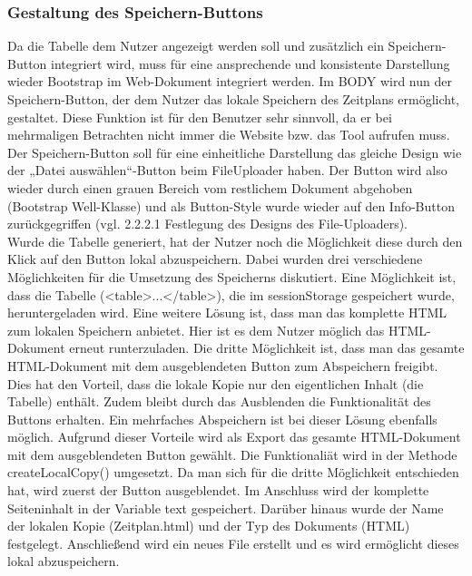{\subsubsection{Gestaltung des Speichern-Buttons}
Da die Tabelle dem Nutzer angezeigt werden soll und zusätzlich ein Speichern-Button integriert wird, muss für eine ansprechende und konsistente Darstellung wieder Bootstrap im Web-Dokument integriert werden. Im BODY wird nun der Speichern-Button, der dem Nutzer das lokale Speichern des Zeitplans ermöglicht, gestaltet. Diese Funktion ist für den Benutzer sehr sinnvoll, da er bei mehrmaligen Betrachten nicht immer die Website bzw. das Tool aufrufen muss. Der Speichern-Button soll für eine einheitliche Darstellung das gleiche Design wie der „Datei auswählen“-Button beim FileUploader haben. Der Button wird also wieder durch einen grauen Bereich vom restlichem Dokument abgehoben (Bootstrap Well-Klasse) und als Button-Style wurde wieder auf den Info-Button zurückgegriffen (vgl. 2.2.2.1 Festlegung des Designs des File-Uploaders).\\
Wurde die Tabelle generiert, hat der Nutzer noch die Möglichkeit diese durch den Klick auf den Button lokal abzuspeichern. Dabei wurden drei verschiedene Möglichkeiten für die Umsetzung des Speicherns diskutiert. Eine Möglichkeit ist, dass die Tabelle (<table>...</table>), die im sessionStorage gespeichert wurde, heruntergeladen wird. Eine weitere Lösung ist, dass man das komplette HTML zum lokalen Speichern anbietet. Hier ist es dem Nutzer möglich das HTML-Dokument erneut runterzuladen. Die dritte Möglichkeit ist, dass man das gesamte HTML-Dokument mit dem ausgeblendeten Button zum Abspeichern freigibt. Dies hat den Vorteil, dass die lokale Kopie nur den eigentlichen Inhalt (die Tabelle) enthält. Zudem bleibt durch das Ausblenden die Funktionalität des Buttons erhalten. Ein mehrfaches Abspeichern ist bei dieser Lösung ebenfalls möglich. Aufgrund dieser Vorteile wird als Export das gesamte HTML-Dokument mit dem ausgeblendeten Button gewählt. 
Die Funktionaliät wird in der Methode createLocalCopy() umgesetzt. Da man sich für die dritte Möglichkeit entschieden hat, wird zuerst der Button ausgeblendet. Im Anschluss wird der komplette Seiteninhalt in der Variable text gespeichert. Darüber hinaus wurde der Name der lokalen Kopie (Zeitplan.html) und der Typ des Dokuments (HTML) festgelegt. Anschließend wird ein neues File erstellt und es wird ermöglicht dieses lokal abzuspeichern.

}
